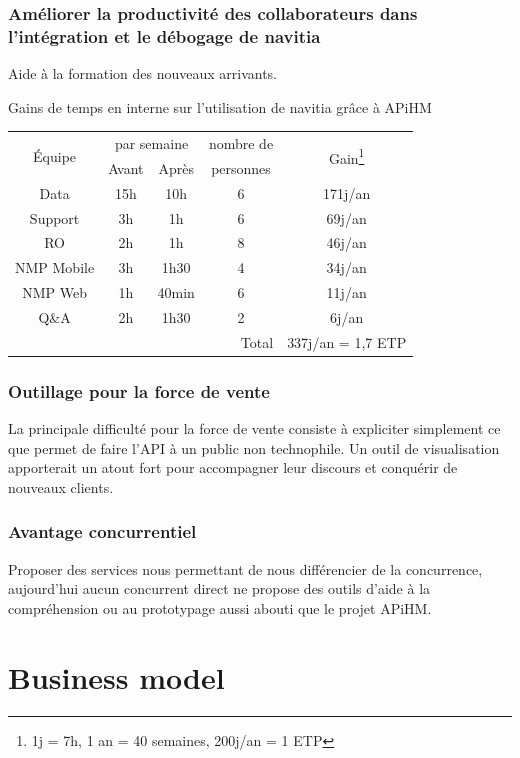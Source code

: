 \documentclass[table]{beamer}
\begin{document}
\begin{frame}
  \frametitle{Améliorer la productivité des collaborateurs dans
    l'intégration et le débogage de navitia}

  Aide à la formation des nouveaux arrivants.

  Gains de temps en interne sur l'utilisation de navitia
  grâce à APiHM
  \vfill
  \centering
  \begin{tabular}{|c|c|c|c|c|}
    \hline
    \multirow{2}{*}{Équipe}& \multicolumn{2}{c|}{par
      semaine}&nombre de&\multirow{2}{*}{Gain\footnote{1j = 7h,
        1 an = 40 semaines, 200j/an = 1 ETP}}\\
    \hhline{~--~~}
    & Avant & Après & personnes &\\
    \hline
    Data       &15h &10h & 6 & 171j/an\\
    Support    & 3h & 1h & 6 &  69j/an\\
    RO         & 2h & 1h & 8 &  46j/an\\
    NMP Mobile & 3h &1h30& 4 &  34j/an\\
    NMP Web    & 1h &40min&6 &  11j/an\\
    Q\&A       & 2h &1h30& 2 &   6j/an\\
    \hline
    \multicolumn{4}{|r|}{Total} &
    337j/an = 1{,}7 ETP\\
    \hline
  \end{tabular}
\end{frame}

\begin{frame}
  \frametitle{Outillage pour la force de vente}

  La principale difficulté pour la force de vente consiste à
  expliciter simplement ce que permet de faire l'API à un public non
  technophile. Un outil de visualisation apporterait un atout fort
  pour accompagner leur discours et conquérir de nouveaux clients.
\end{frame}

\begin{frame}
  \frametitle{Avantage concurrentiel}

  Proposer des services nous permettant de nous différencier de la
  concurrence, aujourd'hui aucun concurrent direct ne propose des
  outils d'aide à la compréhension ou au prototypage aussi abouti que
  le projet APiHM.
\end{frame}

\section{Business model}
\end{document}
